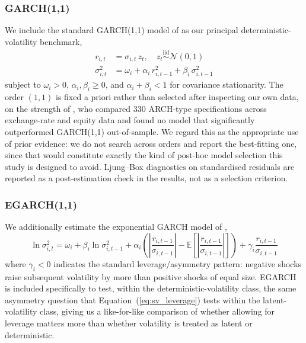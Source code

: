 \documentclass[preprint,12pt,authoryear]{elsarticle}
\begin{document}
\subsubsection{GARCH(1,1)}

We include the standard GARCH(1,1) model of \citet{bollerslev1986} as our principal deterministic-volatility benchmark,
\begin{align}
  r_{i,t} &= \sigma_{i,t}\, z_t, \quad z_t \overset{\text{iid}}{\sim} \mathcal{N}(0,1) \label{eq:garch_mean}\\
  \sigma_{i,t}^2 &= \omega_i + \alpha_i\, r_{i,t-1}^2 + \beta_i\, \sigma_{i,t-1}^2 \label{eq:garch_var}
\end{align}
subject to $\omega_i > 0$, $\alpha_i, \beta_i \geq 0$, and $\alpha_i + \beta_i < 1$ for covariance stationarity. The order $(1,1)$ is fixed a priori rather than selected after inspecting our own data, on the strength of \citet{hansenlunde2005}, who compared 330 ARCH-type specifications across exchange-rate and equity data and found no model that significantly outperformed GARCH(1,1) out-of-sample. We regard this as the appropriate use of prior evidence: we do not search across orders and report the best-fitting one, since that would constitute exactly the kind of post-hoc model selection this study is designed to avoid. Ljung--Box diagnostics on standardised residuals are reported as a post-estimation check in the results, not as a selection criterion.

\subsubsection{EGARCH(1,1)}

We additionally estimate the exponential GARCH model of \citet{nelson1991},
\begin{equation}
  \ln \sigma_{i,t}^2 = \omega_i + \beta_i \ln \sigma_{i,t-1}^2 + \alpha_i \left(\left|\frac{r_{i,t-1}}{\sigma_{i,t-1}}\right| - \mathbb{E}\!\left[\left|\frac{r_{i,t-1}}{\sigma_{i,t-1}}\right|\right]\right) + \gamma_i \frac{r_{i,t-1}}{\sigma_{i,t-1}}
  \label{eq:egarch}
\end{equation}
where $\gamma_i < 0$ indicates the standard leverage/asymmetry pattern: negative shocks raise subsequent volatility by more than positive shocks of equal size. EGARCH is included specifically to test, within the deterministic-volatility class, the same asymmetry question that Equation~(\ref{eq:sv_leverage}) tests within the latent-volatility class, giving us a like-for-like comparison of whether allowing for leverage matters more than whether volatility is treated as latent or deterministic.
\end{document}

